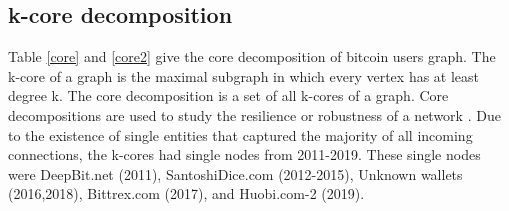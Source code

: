 \documentclass[preprint,12pt]{elsarticle}
\begin{document}
\subsection{k-core decomposition}
Table \ref{core} and \ref{core2} give the core decomposition of bitcoin users graph. The k-core of a graph is the maximal subgraph in which every vertex has at least degree k. The core decomposition is a set of all k-cores of a graph. Core decompositions are used to study the resilience or robustness of a network \cite{malliaros2020core}. Due to the existence of single entities that captured the majority of all incoming connections, the k-cores had single nodes from 2011-2019. These single nodes were DeepBit.net (2011), SantoshiDice.com (2012-2015), Unknown wallets (2016,2018), Bittrex.com (2017), and Huobi.com-2 (2019). 


\begin{table}[H]
\centering
\caption{Core decomposition (2009-2015)}
\label{core}
\end{table}


\begin{table}[H]
\centering
\caption{Core decomposition (2016-2020)}
\label{core2}
\end{table}
\end{document}
